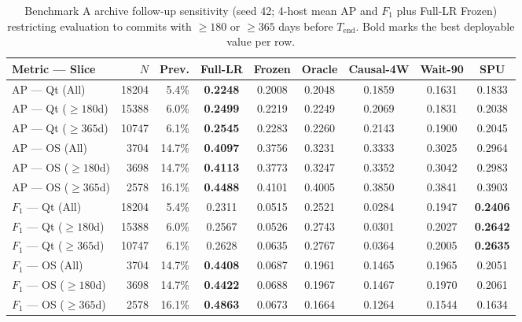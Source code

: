 \documentclass[10pt,a4paper]{article}
\begin{document}
\begin{table}[!htbp]
\centering
\caption{Benchmark A archive follow-up sensitivity (seed 42; 4-host mean AP and $F_1$ plus Full-LR Frozen) restricting evaluation to commits with $\ge 180$ or $\ge 365$ days before $T_{\mathrm{end}}$. Bold marks the best deployable value per row.}
\label{tab:followup_sensitivity}
\fontsize{7.5}{9.0}\selectfont
\setlength{\tabcolsep}{2.0pt}
\begin{tabular*}{\textwidth}{@{\extracolsep\fill}lrrcccccc@{}}
\toprule
\textbf{Metric --- Slice} & \textbf{$N$} & \textbf{Prev.} & \textbf{Full-LR} & \textbf{Frozen} & \textbf{Oracle} & \textbf{Causal-4W} & \textbf{Wait-90} & \textbf{SPU} \\
\midrule
AP --- Qt (All) & 18204 & 5.4\% & \textbf{0.2248} & 0.2008 & 0.2048 & 0.1859 & 0.1631 & 0.1833 \\
AP --- Qt ($\ge 180$d) & 15388 & 6.0\% & \textbf{0.2499} & 0.2219 & 0.2249 & 0.2069 & 0.1831 & 0.2038 \\
AP --- Qt ($\ge 365$d) & 10747 & 6.1\% & \textbf{0.2545} & 0.2283 & 0.2260 & 0.2143 & 0.1900 & 0.2045 \\
AP --- OS (All) & 3704 & 14.7\% & \textbf{0.4097} & 0.3756 & 0.3231 & 0.3333 & 0.3025 & 0.2964 \\
AP --- OS ($\ge 180$d) & 3698 & 14.7\% & \textbf{0.4113} & 0.3773 & 0.3247 & 0.3352 & 0.3042 & 0.2983 \\
AP --- OS ($\ge 365$d) & 2578 & 16.1\% & \textbf{0.4488} & 0.4101 & 0.4005 & 0.3850 & 0.3841 & 0.3903 \\
\midrule
$F_1$ --- Qt (All) & 18204 & 5.4\% & 0.2311 & 0.0515 & 0.2521 & 0.0284 & 0.1947 & \textbf{0.2406} \\
$F_1$ --- Qt ($\ge 180$d) & 15388 & 6.0\% & 0.2567 & 0.0526 & 0.2743 & 0.0301 & 0.2027 & \textbf{0.2642} \\
$F_1$ --- Qt ($\ge 365$d) & 10747 & 6.1\% & 0.2628 & 0.0635 & 0.2767 & 0.0364 & 0.2005 & \textbf{0.2635} \\
$F_1$ --- OS (All) & 3704 & 14.7\% & \textbf{0.4408} & 0.0687 & 0.1961 & 0.1465 & 0.1965 & 0.2051 \\
$F_1$ --- OS ($\ge 180$d) & 3698 & 14.7\% & \textbf{0.4422} & 0.0688 & 0.1967 & 0.1467 & 0.1970 & 0.2061 \\
$F_1$ --- OS ($\ge 365$d) & 2578 & 16.1\% & \textbf{0.4863} & 0.0673 & 0.1664 & 0.1264 & 0.1544 & 0.1634 \\
\bottomrule
\end{tabular*}
\end{table}
\end{document}
